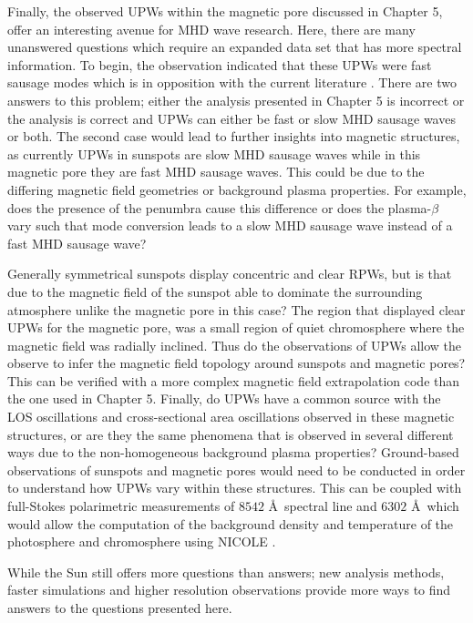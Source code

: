 	Finally, the observed UPWs within the magnetic pore discussed in Chapter 5, offer an interesting avenue for MHD wave research.
	Here, there are many unanswered questions which require an expanded data set that has more spectral information.
	To begin, the observation indicated that these UPWs were fast sausage modes which is in opposition with the current literature \citep{Bloomfiel2008,Jess2013}.
	There are two answers to this problem; either the analysis presented in Chapter 5 is incorrect or the analysis is correct and UPWs can either be fast or slow MHD sausage waves or both.
	The second case would lead to further insights into magnetic structures, as currently UPWs in sunspots are slow MHD sausage waves while in this magnetic pore they are fast MHD sausage waves.
	This could be due to the differing magnetic field geometries or background plasma properties.
	For example, does the presence of the penumbra cause this difference or does the plasma-$\beta$ vary such that mode conversion leads to a slow MHD sausage wave instead of a fast MHD sausage wave?
	
	Generally symmetrical sunspots display concentric and clear RPWs, but is that due to the magnetic field of the sunspot able to dominate the surrounding atmosphere unlike the magnetic pore in this case?
	The region that displayed clear UPWs for the magnetic pore, was a small region of quiet chromosphere where the magnetic field was radially inclined.
	Thus do the observations of UPWs allow the observe to infer the magnetic field topology around sunspots and magnetic pores?
	This can be verified with a more complex magnetic field extrapolation code than the one used in Chapter 5.
	Finally, do UPWs have a common source with the LOS oscillations and cross-sectional area oscillations observed in these magnetic structures, or are they the same phenomena that is observed in several different ways due to the non-homogeneous background plasma properties?
	Ground-based observations of sunspots and magnetic pores would need to be conducted in order to understand how UPWs vary within these structures.
	This can be coupled with full-Stokes polarimetric measurements of  $8542$ \AA\ spectral line and  $6302$ \AA\ which would allow the computation of the background density and temperature of the photosphere and chromosphere using NICOLE \citep{2015A&A...577A...7S,2015ApJ...798..100B}.
	
	While the Sun still offers more questions than answers; new analysis methods, faster simulations and higher resolution observations provide more ways to find answers to the questions presented here.